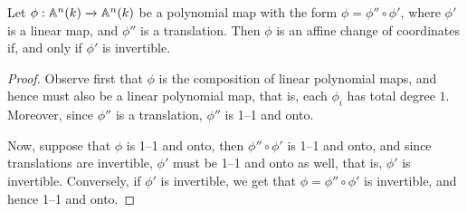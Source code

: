 \begin{lemma}\label{lemma_2.2.2}
  Let $\phi:\mathbb{A}^n(k) \xrightarrow{} \mathbb{A}^n(k)$ be a polynomial map with the form
  $\phi=\phi'' \circ \phi'$, where $\phi'$ is a linear map, and  $\phi''$ is a
  translation. Then $\phi$ is an affine change of coordinates if, and only if
  $\phi'$ is invertible.
\end{lemma}
\begin{proof}
  Observe first that $\phi$ is the composition of linear polynomial maps, and
  hence must also be a linear polynomial map, that is, each  $\phi_i$ has total
  degree $1$. Moreover, since $\phi''$ is a translation, $\phi''$ is 1--1 and
  onto.

  Now, suppose that $\phi$ is 1--1 and onto, then  $\phi'' \circ \phi'$ is 1--1
  and onto, and since translations are invertible, $\phi'$ must be 1--1 and onto
  as well, that is, $\phi'$ is invertible. Conversely, if  $\phi'$ is
  invertible, we get that $\phi=\phi'' \circ \phi'$ is invertible, and hence
  1--1 and onto.
\end{proof}

